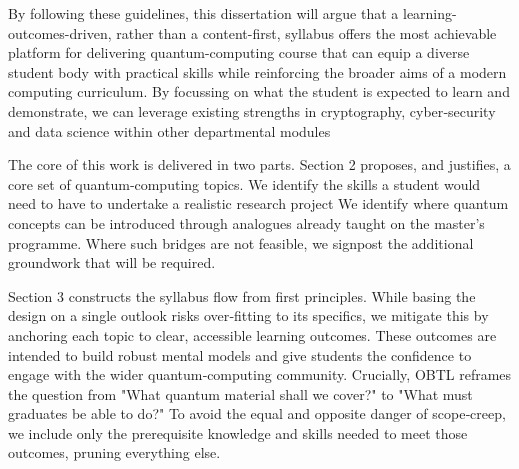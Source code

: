 By following these guidelines, this dissertation will argue that a learning-outcomes-driven, rather than a content-first, syllabus 
offers the most achievable platform for delivering quantum-computing course 
that can equip a diverse student body with practical skills while reinforcing the broader aims of a modern computing curriculum. 
By focussing on what the student is expected to learn and demonstrate, we can leverage existing strengths 
in cryptography, cyber‑security and data science within other departmental modules
 
The core of this work is delivered in two parts.  
Section 2 proposes, and justifies, a core set of quantum‑computing topics.
We identify the skills a student would need to have to undertake a realistic research project 
We identify where quantum concepts can be introduced through analogues already taught on the master's programme.
Where such bridges are not feasible, we signpost the additional groundwork that will be required.


Section 3 constructs the syllabus flow from first principles. 
While basing the design on a single outlook risks over‑fitting to its specifics, 
we mitigate this by anchoring each topic to clear, accessible learning outcomes.
These outcomes are intended to build robust mental models and give students the confidence to engage with the wider quantum‑computing community. 
Crucially, OBTL reframes the question from "What quantum material shall we cover?" to "What must graduates be able to do?"
To avoid the equal and opposite danger of scope‑creep, we include only the prerequisite knowledge and skills needed to meet those outcomes, pruning everything else.


